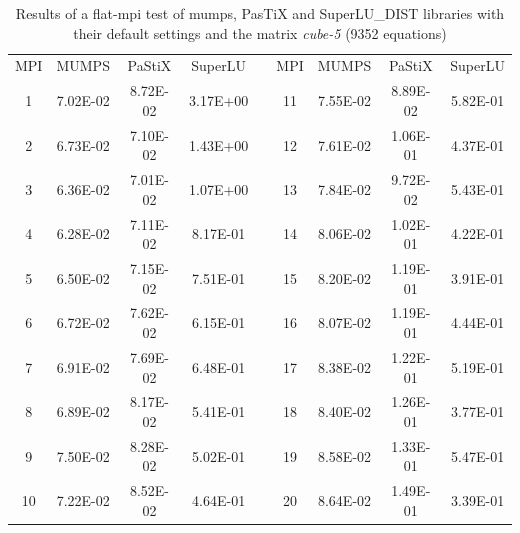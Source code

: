\begin{table}[ht]
\centering
\begin{tabular}{|c|c|c|c|l|c|c|c|c|}
\cline{1-4} \cline{6-9}
MPI & MUMPS    & PaStiX   & SuperLU  &  & MPI & MUMPS    & PaStiX   & SuperLU  \\ \cline{1-4} \cline{6-9} 
1   & 7.02E-02 & 8.72E-02 & 3.17E+00 &  & 11  & 7.55E-02 & 8.89E-02 & 5.82E-01 \\ \cline{1-4} \cline{6-9} 
2   & 6.73E-02 & 7.10E-02 & 1.43E+00 &  & 12  & 7.61E-02 & 1.06E-01 & 4.37E-01 \\ \cline{1-4} \cline{6-9} 
3   & 6.36E-02 & 7.01E-02 & 1.07E+00 &  & 13  & 7.84E-02 & 9.72E-02 & 5.43E-01 \\ \cline{1-4} \cline{6-9} 
4   & 6.28E-02 & 7.11E-02 & 8.17E-01 &  & 14  & 8.06E-02 & 1.02E-01 & 4.22E-01 \\ \cline{1-4} \cline{6-9} 
5   & 6.50E-02 & 7.15E-02 & 7.51E-01 &  & 15  & 8.20E-02 & 1.19E-01 & 3.91E-01 \\ \cline{1-4} \cline{6-9} 
6   & 6.72E-02 & 7.62E-02 & 6.15E-01 &  & 16  & 8.07E-02 & 1.19E-01 & 4.44E-01 \\ \cline{1-4} \cline{6-9} 
7   & 6.91E-02 & 7.69E-02 & 6.48E-01 &  & 17  & 8.38E-02 & 1.22E-01 & 5.19E-01 \\ \cline{1-4} \cline{6-9} 
8   & 6.89E-02 & 8.17E-02 & 5.41E-01 &  & 18  & 8.40E-02 & 1.26E-01 & 3.77E-01 \\ \cline{1-4} \cline{6-9} 
9   & 7.50E-02 & 8.28E-02 & 5.02E-01 &  & 19  & 8.58E-02 & 1.33E-01 & 5.47E-01 \\ \cline{1-4} \cline{6-9} 
10  & 7.22E-02 & 8.52E-02 & 4.64E-01 &  & 20  & 8.64E-02 & 1.49E-01 & 3.39E-01 \\ \cline{1-4} \cline{6-9} 
\end{tabular}
\caption{Results of a flat-\gls{mpi} test of \gls{mumps}, PasTiX and SuperLU\_DIST libraries with their default settings and the matrix \textit{cube-5} (9352 equations)}
\label{table:lc-cube-5-result}
\end{table}


